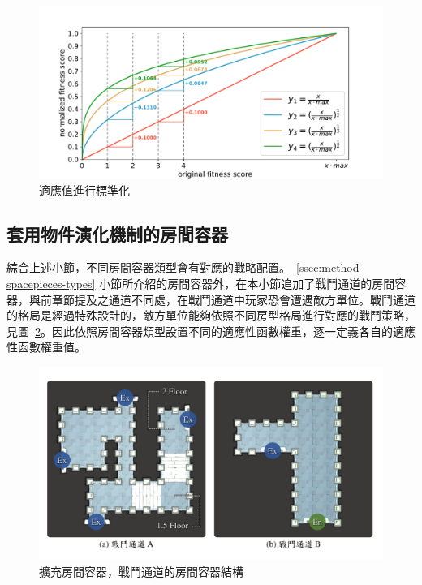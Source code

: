 \begin{figure}[!htb]
  \begin{center}
    \includegraphics[width=1.0\textwidth]{figures/fitnesses-normalized.pdf}
    \caption{適應值進行標準化}
    \label{fig:fitnesses-normalized}
  \end{center}
\end{figure}

\subsection{套用物件演化機制的房間容器}
\label{ssec:method-segments-appliedonvolumes}

綜合上述小節，不同房間容器類型會有對應的戰略配置。~\ref{ssec:method-spacepieces-types} 小節所介紹的房間容器外，在本小節追加了戰鬥通道的房間容器，與前章節提及之通道不同處，在戰鬥通道中玩家恐會遭遇敵方單位。戰鬥通道的格局是經過特殊設計的，敵方單位能夠依照不同房型格局進行對應的戰鬥策略，見圖~\ref{fig:roomtype-mainpath-extend}。因此依照房間容器類型設置不同的適應性函數權重，逐一定義各自的適應性函數權重值。

\begin{figure}[!htb]
  \begin{center}
    \includegraphics[width=1.0\textwidth]{figures/roomtype-mainpath-extend.pdf}
    \caption{擴充房間容器，戰鬥通道的房間容器結構}
    \label{fig:roomtype-mainpath-extend}
  \end{center}
\end{figure}

